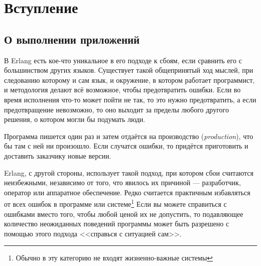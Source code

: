 \chapter*{Вступление}
\label{chap:introduction}
\setcounter{page}{1}


\section*{О выполнении приложений}
\label{sec:on-running-software}

В Erlang есть кое-что уникальное в его подходе к сбоям, если сравнить его с большинством других языков. Существует такой общепринятый ход мыслей, при следованию которому и сам язык, и окружение, в котором работает программист, и методология делают всё возможное, чтобы предотвратить ошибки. Если во время исполнения что-то может пойти не так, то это нужно предотвратить, а если предотвращение невозможно, то оно выходит за пределы любого другого решения, о котором могли бы подумать люди.

Программа пишется один раз и затем отдаётся на производство (\emph{production}), что бы там с ней ни произошло. Если случатся ошибки, то придётся приготовить и доставить заказчику новые версии.

Erlang, с другой стороны, использует такой подход, при котором сбои считаются неизбежными, независимо от того, что явилось их причиной --- разработчик, оператор или аппаратное обеспечение. Редко считается практичным избавляться от всех ошибок в программе или системе\footnote{Обычно в эту категорию не входят жизненно-важные системы} Если вы можете справиться с ошибками вместо того, чтобы любой ценой их не допустить, то подавляющее количество неожиданных поведений программы может быть разрешено с помощью этого подхода <<справься с ситуацией сам>>.

